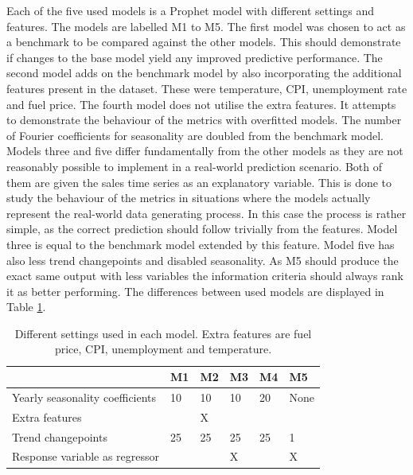 \documentclass[english, 12pt, a4paper, sci, utf8, a-1b, online]{aaltothesis}
\begin{document}
Each of the five used models is a Prophet model with different settings and features. The models are labelled M1 to M5. The first model was chosen to act as a benchmark to be compared against the other models. This should demonstrate if changes to the base model yield any improved predictive performance. The second model adds on the benchmark model by also incorporating the additional features present in the dataset. These were temperature, CPI, unemployment rate and fuel price. The fourth model does not utilise the extra features. It attempts to demonstrate the behaviour of the metrics with overfitted models. The number of Fourier coefficients for seasonality are doubled from the benchmark model. Models three and five differ fundamentally from the other models as they are not reasonably possible to implement in a real-world prediction scenario. Both of them are given the sales time series as an explanatory variable. This is done to study the behaviour of the metrics in situations where the models actually represent the real-world data generating process. In this case the process is rather simple, as the correct prediction should follow trivially from the features. Model three is equal to the benchmark model extended by this feature. Model five has also less trend changepoints and disabled seasonality. As M5 should produce the exact same output with less variables the information criteria should always rank it as better performing. The differences between used models are displayed in Table \ref{tab:model_settings}.


\begin{table}[]
	\centering
	\caption{\label{tab:model_settings} Different settings used in each model. Extra features are fuel price, CPI, unemployment and temperature.}
	\begin{tabular}{|l|l|l|l|l|l|}
		\hline
																		& \textbf{M1} & \textbf{M2} & \textbf{M3} & \textbf{M4} & \textbf{M5} \\ \hline
		Yearly seasonality coefficients & 10          & 10          & 10          & 20          & None        \\ \hline
		Extra features                  &             & X           &             &             &             \\ \hline
		Trend changepoints              & 25          & 25          & 25          & 25          & 1           \\ \hline
		Response variable as regressor  &             &             & X           &             & X           \\ \hline
		\end{tabular}
\end{table}
\end{document}
